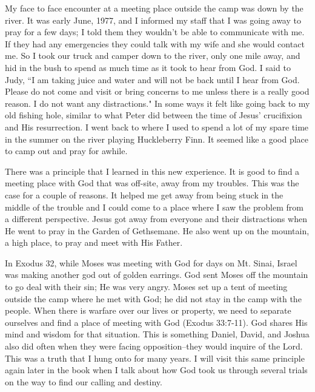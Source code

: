 \documentclass[oneside]{book}
\begin{document}
My face to face encounter at a meeting place outside the camp was down by the river. It was early June, 1977, and I informed my staff that I was going away to pray for a few days; I told them they wouldn't be able to communicate with me. If they had any emergencies they could talk with my wife and she would contact me. So I took our truck and camper down to the river, only one mile away, and hid in the bush to spend as much time as it took to hear from God. I said to Judy, ``I am taking juice and water and will not be back until I hear from God. Please do not come and visit or bring concerns to me unless there is a really good reason. I do not want any distractions." In some ways it felt like going back to my old fishing hole, similar to what Peter did between the time of Jesus' crucifixion and His resurrection. I went back to where I used to spend a lot of my spare time in the summer on the river playing Huckleberry Finn. It seemed like a good place to camp out and pray for awhile.

There was a principle that I learned in this new experience. It is good to find a meeting place with God that was off-site, away from my troubles. This was the case for a couple of reasons. It helped me get away from being stuck in the middle of the trouble and I could come to a place where I saw the problem from a different perspective. Jesus got away from everyone and their distractions when He went to pray in the Garden of Gethsemane. He also went up on the mountain, a high place, to pray and meet with His Father. 

In Exodus 32, while Moses was meeting with God for days on Mt. Sinai, Israel was making another god out of golden earrings. God sent Moses off the mountain to go deal with their sin;  He was very angry. Moses set up a tent of meeting outside the camp where he met with God; he did not stay in the camp with the people. When there is warfare over our lives or property, we need to separate ourselves and find a place of meeting with God (Exodus 33:7-11). God shares His mind and wisdom for that situation. This is something Daniel, David, and Joshua also did often when they were facing opposition--they would inquire of the Lord. This was a truth that I hung onto for many years. I will visit this same principle again later in the book when I talk about how God took us through several trials on the way to find our calling and destiny.
\end{document}
